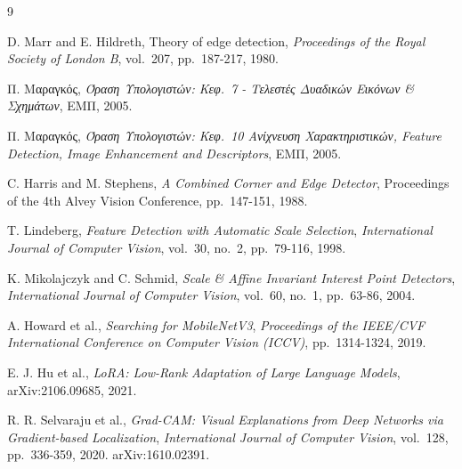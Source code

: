 \documentclass[12pt, a4paper]{article}
\begin{document}
\clearpage
\begin{thebibliography}{9}

D. Marr and E. Hildreth,
Theory of edge detection,
\textit{Proceedings of the Royal Society of London B}, vol.\ 207, pp.\ 187-217, 1980.

Π. Μαραγκός,
\textit{Όραση Υπολογιστών: Κεφ.\ 7 - Τελεστές Δυαδικών Εικόνων \& Σχημάτων},
ΕΜΠ, 2005.

Π. Μαραγκός,
\textit{Όραση Υπολογιστών: Κεφ.\ 10 Ανίχνευση Χαρακτηριστικών, Feature Detection, Image Enhancement and Descriptors},
ΕΜΠ, 2005.

C. Harris and M. Stephens,
\textit{A Combined Corner and Edge Detector},
Proceedings of the 4th Alvey Vision Conference, pp.\ 147-151, 1988.

T. Lindeberg,
\textit{Feature Detection with Automatic Scale Selection},
\textit{International Journal of Computer Vision}, vol.\ 30, no.\ 2, pp.\ 79-116, 1998.

K. Mikolajczyk and C. Schmid,
\textit{Scale \& Affine Invariant Interest Point Detectors},
\textit{International Journal of Computer Vision}, vol.\ 60, no.\ 1, pp.\ 63-86, 2004.

A. Howard et al.,
\textit{Searching for MobileNetV3},
\textit{Proceedings of the IEEE/CVF International Conference on Computer Vision (ICCV)}, pp.\ 1314-1324, 2019.

E. J. Hu et al.,
\textit{LoRA: Low-Rank Adaptation of Large Language Models},
arXiv:2106.09685, 2021.

R. R. Selvaraju et al.,
\textit{Grad-CAM: Visual Explanations from Deep Networks via Gradient-based Localization},
\textit{International Journal of Computer Vision}, vol.\ 128, pp.\ 336-359, 2020.
arXiv:1610.02391.

\end{thebibliography}
\end{document}
